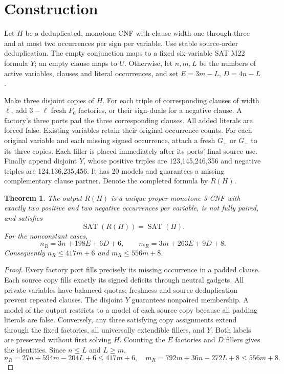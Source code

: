 \documentclass[11pt]{article}
\newtheorem{theorem}{Theorem}
\newcommand{\SAT}{\operatorname{SAT}}
\begin{document}
\section{Construction}
Let \(H\) be a deduplicated, monotone CNF with clause width one through three
and at most two occurrences per sign per variable. Use stable source-order
deduplication. The empty conjunction maps to a fixed six-variable SAT M22
formula \(Y\); an empty clause maps to \(U\). Otherwise, let \(n,m,L\) be the
numbers of active variables, clauses and literal occurrences, and set
\(E=3m-L\), \(D=4n-L\).

Make three disjoint copies of \(H\). For each triple of corresponding clauses
of width \(\ell\), add \(3-\ell\) fresh \(F_0\) factories, or their sign-duals for a
negative clause. A factory's three ports pad the three corresponding clauses.
All added literals are forced false. Existing variables retain their original
occurrence counts. For each original variable and each missing signed
occurrence, attach a fresh \(G_+\) or \(G_-\) to its three copies. Each filler
is placed immediately after its ports' final source use. Finally append
 disjoint \(Y\), whose positive triples are 123,145,246,356 and negative
triples are 124,136,235,456. It has 20 models and guarantees a missing
complementary clause partner. Denote the completed formula by \(R(H)\).

\begin{theorem}
The output \(R(H)\) is a unique proper monotone 3-CNF with exactly two positive
and two negative occurrences per variable, is not fully paired, and satisfies
\[
\SAT(R(H))=\SAT(H).
\]
For the nonconstant cases,
\[
n_R=3n+198E+6D+6,\qquad m_R=3m+263E+9D+8.
\]
Consequently \(n_R\le417m+6\) and \(m_R\le556m+8\).
\end{theorem}
\begin{proof}
Every factory port fills precisely its missing occurrence in a padded clause.
Each source copy fills exactly its signed deficits through neutral gadgets.
All private variables have balanced quotas; freshness and source
deduplication prevent repeated clauses. The disjoint \(Y\) guarantees
nonpaired membership. A model of the output restricts to a model of each
source copy because all padding literals are false. Conversely, any three
satisfying copy assignments extend through the fixed factories, all
universally extendible fillers, and \(Y\). Both labels are preserved without
first solving \(H\). Counting the \(E\) factories and \(D\) fillers gives the
identities. Since \(n\le L\) and \(L\ge m\),
\[
n_R=27n+594m-204L+6\le417m+6,
\quad m_R=792m+36n-272L+8\le556m+8.
\]
\end{proof}
\end{document}
